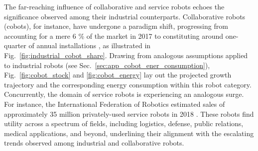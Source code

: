 \documentclass[12pt]{article}
\begin{document}
The far-reaching influence of collaborative and service robots echoes the significance observed among their industrial counterparts. Collaborative robots (cobots), for instance, have undergone a paradigm shift, progressing from accounting for a mere 6 \% of the market in 2017 to constituting around one-quarter of annual installations \cite{tobe2015}, as illustrated in Fig.~\ref{fig:industrial_cobot_share}. Drawing from analogous assumptions applied to industrial robots (see Sec.~\ref{sec:app_cobot_ener_consumption}), Fig.~\ref{fig:cobot_stock} and \ref{fig:cobot_energy} lay out the projected growth trajectory and the corresponding energy consumption within this robot category. Concurrently, the domain of service robots is experiencing an analogous surge. For instance, the International Federation of Robotics estimated sales of approximately 35 million privately-used service robots in 2018 \cite{IFR2015}. These robots find utility across a spectrum of fields, including logistics, defense, public relations, medical applications, and beyond, underlining their alignment with the escalating trends observed among industrial and collaborative robots.


\end{document}
